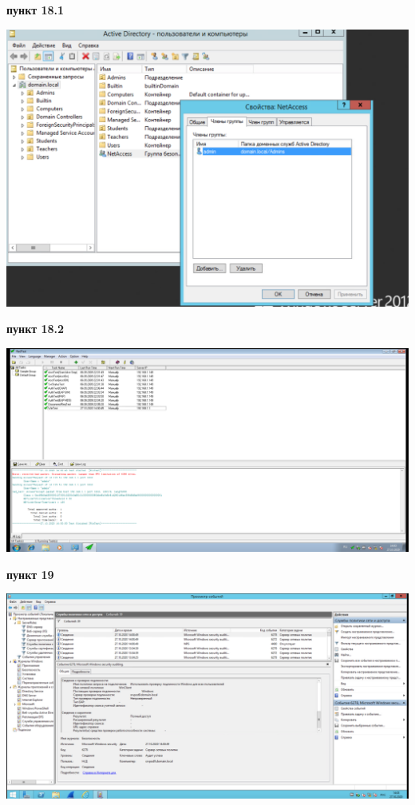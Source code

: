 \documentclass[a4paper,14pt]{extarticle}
\begin{document}
    \textbf{пункт 18.1}
    \begin{center}
        \includegraphics[scale=0.7]{18.1.png}
    \end{center}
    
    \newpage
    \textbf{пункт 18.2}
    \begin{center}
        \includegraphics[scale=0.4]{18.2.png}
    \end{center}
    
    \textbf{пункт 19}
    \begin{center}
        \includegraphics[scale=0.4]{19.png}
    \end{center}
    
\end{document}

